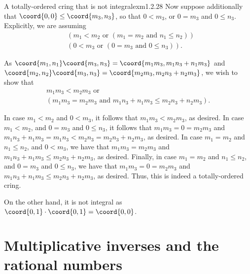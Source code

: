 \begin{exm}{A totally-ordered cring that is not integral}{exm1.2.28}
Now suppose additionally that $\coord{0,0}\leq \coord{m_3,n_3}$, so that $0<m_3$, or $0=m_3$ and $0\leq n_3$.  Explicitly, we are assuming
\begin{equation}
\begin{aligned}
&\left( m_1<m_2\text{ or }\left( m_1=m_2\text{ and }n_1\leq n_2\right) \right) \\ &\left( 0<m_3\text{ or }\left( 0=m_3\text{ and }0\leq n_3\right) \right) .
\end{aligned}
\end{equation}

As $\coord{m_1,n_1}\coord{m_3,n_3}=\coord{m_1m_3,m_1n_3+n_1m_3}$ and $\coord{m_2,n_2}\coord{m_3,n_3}=\coord{m_2m_3,m_2n_3+n_2m_3}$, we wish to show that
\begin{equation}
\begin{multlined}
m_1m_3<m_2m_3\text{ or } \\ \left( m_1m_3=m_2m_3\text{ and }m_1n_3+n_1m_3\leq m_2n_3+n_2m_3\right) .
\end{multlined}
\end{equation}

In case $m_1<m_2$ and $0<m_3$, it follows that $m_1m_3<m_2m_3$, as desired.  In case $m_1<m_2$, and $0=m_3$ and $0\leq n_3$, it follows that $m_1m_3=0=m_2m_3$ and $m_1n_3+n_1m_3=m_1n_3<m_2n_3=m_2n_3+n_2m_3$, as desired.  In case $m_1=m_2$ and $n_1\leq n_2$, and $0<m_3$, we have that $m_1m_3=m_2m_3$ and $m_1n_3+n_1m_3\leq m_2n_3+n_2m_3$, as desired.  Finally, in case $m_1=m_2$ and $n_1\leq n_2$, and $0=m_3$ and $0\leq n_3$, we have that $m_1m_3=0=m_2m_3$ and $m_1n_3+n_1m_3\leq m_2n_3+n_2m_3$, as desired.  Thus, this is indeed a totally-ordered cring.

On the other hand, it is not integral as $\coord{0,1}\cdot \coord{0,1}=\coord{0,0}$.
\end{exm}

\section{Multiplicative inverses and the rational numbers}

